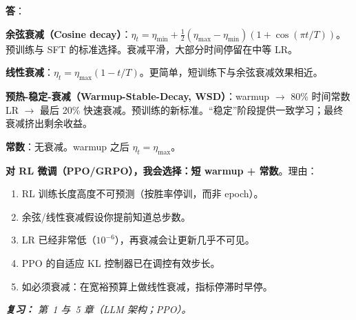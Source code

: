 \begin{questionbox}
\textbf{答}：

\textbf{余弦衰减（Cosine decay）}：$\eta_t = \eta_\text{min} + \frac{1}{2}(\eta_\text{max} - \eta_\text{min})(1 + \cos(\pi t/T))$。预训练与 SFT 的标准选择。衰减平滑，大部分时间停留在中等 LR。

\textbf{线性衰减}：$\eta_t = \eta_\text{max}(1 - t/T)$。更简单，短训练下与余弦衰减效果相近。

\textbf{预热-稳定-衰减（Warmup-Stable-Decay, WSD）}：warmup $\rightarrow$ 80\% 时间常数 LR $\rightarrow$ 最后 20\% 快速衰减。预训练的新标准。“稳定”阶段提供一致学习；最终衰减挤出剩余收益。

\textbf{常数}：无衰减。warmup 之后 $\eta_t = \eta_\text{max}$。

\textbf{对 RL 微调（PPO/GRPO），我会选择：短 warmup + 常数}。理由：

\begin{enumerate}
  \item RL 训练长度高度不可预测（按胜率停训，而非 epoch）。
  \item 余弦/线性衰减假设你提前知道总步数。
  \item LR 已经非常低（$10^{-6}$），再衰减会让更新几乎不可见。
  \item PPO 的自适应 KL 控制器已在调控有效步长。
  \item 如必须衰减：在宽裕预算上做线性衰减，指标停滞时早停。
\end{enumerate}

\emph{\textbf{复习：} 第~1 与~5 章（LLM 架构；PPO）。}
\end{questionbox}

